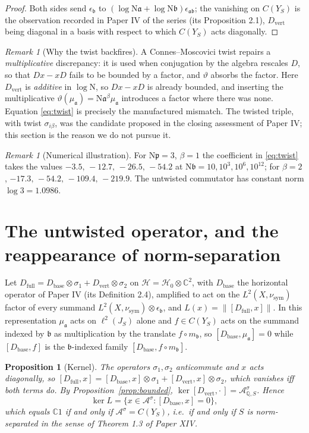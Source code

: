 \documentclass[11pt]{amsart}
\numberwithin{equation}{section}
\newtheorem{proposition}[theorem]{Proposition}
\theoremstyle{definition}
\theoremstyle{remark}
\newtheorem{remark}[theorem]{Remark}
\newcommand{\Q}{\mathbb{Q}}
\newcommand{\C}{\mathbb{C}}
\newcommand{\cA}{\mathcal{A}}
\newcommand{\cH}{\mathcal{H}}
\newcommand{\pp}{\mathfrak{p}}
\newcommand{\aaa}{\mathfrak{a}}
\newcommand{\bb}{\mathfrak{b}}
\newcommand{\Ns}{\mathrm{N}}
\newcommand{\Db}{D_{\mathrm{base}}}
\newcommand{\Dv}{D_{\mathrm{vert}}}
\newcommand{\Df}{D_{\mathrm{full}}}
\newcommand{\nusym}{\nu_{\mathrm{sym}}}
\begin{document}
\begin{proof}
Both sides send $\epsilon_\bb$ to $(\log\Ns\aaa+\log\Ns\bb)\epsilon_{\aaa\bb}$; the vanishing
on $C(Y_S)$ is the observation recorded in Paper IV of the series (its Proposition 2.1),
$\Dv$ being diagonal in a basis with respect to which $C(Y_S)$ acts diagonally.
\end{proof}

\begin{remark}[Why the twist backfires]\label{rem:whybackfire}
A Connes--Moscovici twist \cite{CM} repairs a \emph{multiplicative} discrepancy: it is used when
conjugation by the algebra rescales $D$, so that $Dx-xD$ fails to be bounded by a factor,
and $\vartheta$ absorbs the factor. Here $\Dv$ is \emph{additive} in $\log\Ns$, so
$Dx-xD$ is already bounded, and inserting the multiplicative $\vartheta(\mu_\aaa)=\Ns\aaa^\beta\mu_\aaa$
introduces a factor where there was none. Equation \eqref{eq:twist} is precisely the
manufactured mismatch. The twisted triple, with twist $\sigma_{i\beta}$, was the candidate
proposed in the closing assessment of Paper IV; this section is the reason we do not pursue
it.
\end{remark}

\begin{remark}[Numerical illustration]\label{rem:numtwist}
For $\Ns\pp=3$, $\beta=1$ the coefficient in \eqref{eq:twist} takes the values
$-3.5,\,-12.7,\,-26.5,\,-54.2$ at $\Ns\bb=10,10^3,10^6,10^{12}$; for $\beta=2$,
$-17.3,\,-54.2,\,-109.4,\,-219.9$. The untwisted commutator has constant norm
$\log3=1.0986$.
\end{remark}

\section{The untwisted operator, and the reappearance of norm-separation}

Let $\Df=\Db\otimes\sigma_1+\Dv\otimes\sigma_2$ on $\cH=\cH_0\otimes\C^2$, with $\Db$ the
horizontal operator of Paper IV (its Definition 2.4), amplified to act on the
$L^2(X,\nusym)$ factor of every summand $L^2(X,\nusym)\otimes\epsilon_\bb$, and
$L(x)=\|[\Df,x]\|$. In this representation $\mu_\aaa$ acts on $\ell^2(J_S)$ alone and $f\in
C(Y_S)$ acts on the summand indexed by $\bb$ as multiplication by the translate
$f\circ m_\bb$, so $[\Db,\mu_\aaa]=0$ while $[\Db,f]$ is the $\bb$-indexed family
$[\Db,f\circ m_\bb]$.

\begin{proposition}[Kernel]\label{prop:kernel}
The operators $\sigma_1,\sigma_2$ anticommute and $x$ acts diagonally, so
$[\Df,x]=[\Db,x]\otimes\sigma_1+[\Dv,x]\otimes\sigma_2$, which vanishes iff both terms do. By
Proposition~\ref{prop:bounded}, $\ker[\Dv,\cdot\,]=\cA^\sigma_{\Q,S}$. Hence
\[
\ker L=\bigl\{x\in\cA^\sigma:[\Db,x]=0\bigr\},
\]
which equals $\C1$ if and only if $\cA^\sigma=C(Y_S)$, i.e.\ if and only if $S$ is
norm-separated in the sense of Theorem 1.3 of Paper XIV.
\end{proposition}
\end{document}
